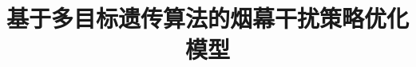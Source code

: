 \usepackage{booktabs} %
\usepackage[framemethod=TikZ]{mdframed}
\usepackage{url}   %
\usepackage{subcaption} %
\title{基于多目标遗传算法的烟幕干扰策略优化模型}
